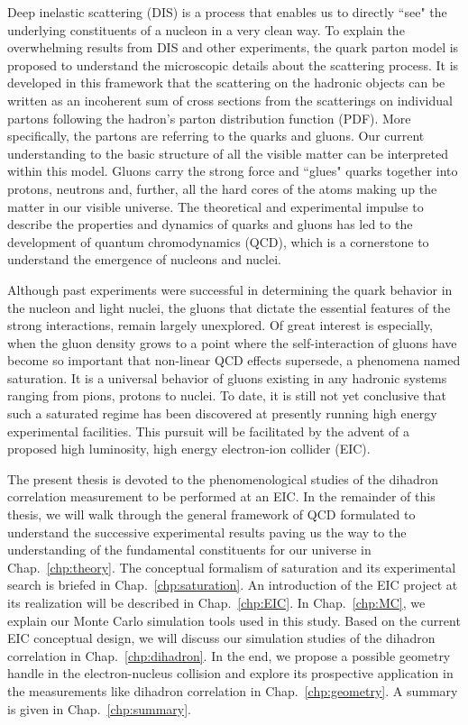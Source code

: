 Deep inelastic scattering (DIS) is a process that enables us to directly ``see"
the underlying constituents of a nucleon in a very clean way. To explain the
overwhelming results from DIS and other experiments, the quark parton model is
proposed to understand the microscopic details about the scattering process. It
is developed in this framework that the scattering on the hadronic objects can
be written as an incoherent sum of cross sections from the scatterings on
individual partons following the hadron's parton distribution function (PDF).
More specifically, the partons are referring to the quarks and gluons. Our
current understanding to the basic structure of all the visible matter can be
interpreted within this model. Gluons carry the strong force and
``glues" quarks together into protons, neutrons and, further, all the hard
cores of the atoms making up the matter in our visible universe. The theoretical
and experimental impulse to describe the properties and dynamics of quarks and
gluons has led to the development of quantum chromodynamics (QCD), which is a
cornerstone to understand the emergence of nucleons and nuclei.


Although past experiments were successful in determining the quark behavior in
the nucleon and light nuclei, the gluons that dictate the essential features
of the strong interactions, remain largely unexplored. Of great interest is
especially, when the gluon density grows to a point where the self-interaction
of gluons have become so important that non-linear QCD effects supersede, a
phenomena named saturation. It is a universal behavior of gluons existing in any
hadronic systems ranging from pions, protons to nuclei. To date, it is still not
yet conclusive that such a saturated regime has been discovered at presently
running high energy experimental facilities. This pursuit will be facilitated by
the advent of a proposed high luminosity, high energy electron-ion collider (EIC).


The present thesis is devoted to the phenomenological studies of the dihadron
correlation measurement to be performed at an EIC. In the remainder of this
thesis, we will walk through the general framework of QCD formulated to
understand the successive experimental results paving us the way to the
understanding of the fundamental constituents for our universe in
Chap.~\ref{chp:theory}. The conceptual formalism of saturation and its
experimental search is briefed in Chap.~\ref{chp:saturation}. An
introduction of the EIC project at its realization will be described in
Chap.~\ref{chp:EIC}. In Chap.~\ref{chp:MC}, we explain our Monte Carlo
simulation tools used in this study. Based on the current EIC conceptual design,
we will discuss our simulation studies of the dihadron correlation in Chap.~\ref{chp:dihadron}. In the end, we propose a possible geometry
handle in the electron-nucleus collision and explore its prospective
application in the measurements like dihadron correlation in
Chap.~\ref{chp:geometry}. A summary is given in Chap.~\ref{chp:summary}.

